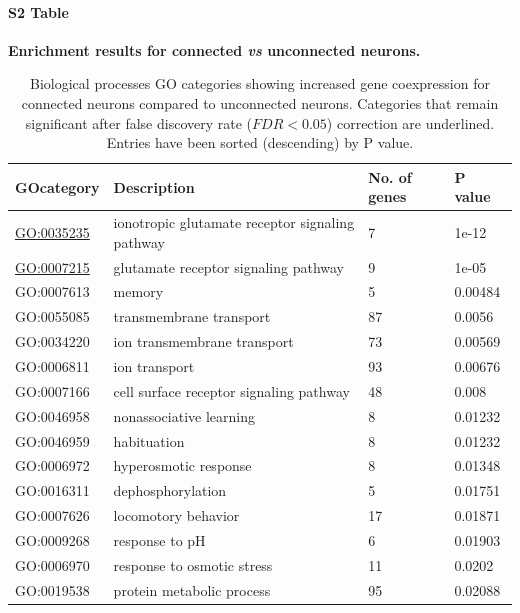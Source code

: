 \documentclass[10pt,letterpaper]{article}
\begin{document}
\paragraph*{S2 Table}
{\bf Enrichment results for connected \textit{vs} unconnected neurons.} 
\begin{table}[]
\centering
\caption{Biological processes GO categories showing increased gene coexpression for connected neurons compared to unconnected neurons. 
Categories that remain significant after false discovery rate ($FDR < 0.05$) correction are underlined.
Entries have been sorted (descending) by P value. }
\label{enrichmentCON}
\begin{tabular}{llll}
\hline
\textbf{GOcategory} & \textbf{Description}                            & \textbf{No. of genes} & \textbf{P value} \\\hline
\underline{GO:0035235}     		& ionotropic glutamate receptor signaling pathway & 7                 & 1e-12         \\
\underline{GO:0007215}          	& glutamate receptor signaling pathway            & 9                 & 1e-05         \\
GO:0007613          & memory                                          & 5                 & 0.00484       \\
GO:0055085          & transmembrane transport                         & 87                & 0.0056        \\
GO:0034220          & ion transmembrane transport                     & 73                & 0.00569       \\
GO:0006811          & ion transport                                   & 93                & 0.00676       \\
GO:0007166          & cell surface receptor signaling pathway         & 48                & 0.008         \\
GO:0046958          & nonassociative learning                         & 8                 & 0.01232       \\
GO:0046959          & habituation                                     & 8                 & 0.01232       \\
GO:0006972          & hyperosmotic response                           & 8                 & 0.01348       \\
GO:0016311          & dephosphorylation                               & 5                 & 0.01751       \\
GO:0007626          & locomotory behavior                             & 17                & 0.01871       \\
GO:0009268          & response to pH                                  & 6                 & 0.01903       \\
GO:0006970          & response to osmotic stress                      & 11                & 0.0202        \\
GO:0019538          & protein metabolic process                       & 95                & 0.02088      
\end{tabular}
\end{table}
\end{document}
